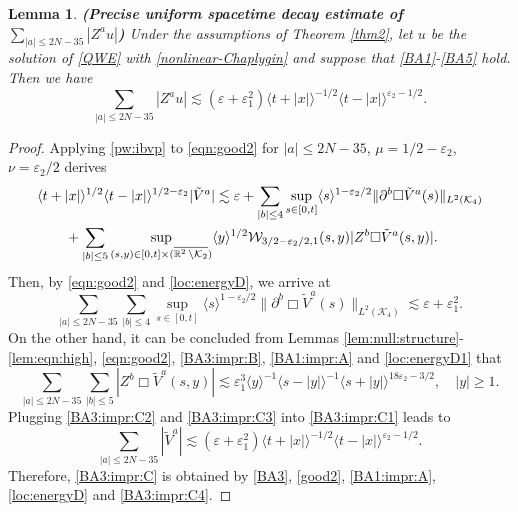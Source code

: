 \documentclass[11pt,twoside]{article}
\def\cK{\mathcal K}
\def\cW{\mathcal W}
\def\R{\mathop{\mathbb R\kern 0pt}\nolimits}
\def\ds{\displaystyle}
\def\p{\partial}
\def\ve{\varepsilon}
\def\ls{\lesssim}
\newcommand{\w}[1]{\langle {#1} \rangle}
\theoremstyle{plain}
\newtheorem{lemma}[theorem]{Lemma}
\theoremstyle{definition}
\numberwithin{equation}{section}
\begin{document}
\begin{lemma}
{\bf (Precise uniform spacetime decay estimate of $\ds\sum_{|a|\le2N-35}|Z^au|$)}
Under the assumptions of Theorem \ref{thm2}, let $u$ be the solution of \eqref{QWE} with \eqref{nonlinear-Chaplygin}
and suppose that \eqref{BA1}-\eqref{BA5} hold.
Then we have
\begin{equation}\label{BA3:impr:C}
\sum_{|a|\le2N-35}|Z^au|\ls(\ve+\ve_1^2)\w{t+|x|}^{-1/2}\w{t-|x|}^{\ve_2-1/2}.
\end{equation}
\end{lemma}
\begin{proof}
Applying \eqref{pw:ibvp} to \eqref{eqn:good2} for $|a|\le2N-35$, $\mu=1/2-\ve_2$, $\nu=\ve_2/2$ derives
\begin{equation}\label{BA3:impr:C1}
\begin{split}
&\w{t+|x|}^{1/2}\w{t-|x|}^{1/2-\ve_2}|\tilde V^a|\ls\ve+\sum_{|b|\le4}\sup_{s\in[0,t]}\w{s}^{1-\ve_2/2}\|\p^b\Box\tilde V^a(s)\|_{L^2(\cK_4)}\\
&\qquad+\sum_{|b|\le5}\sup_{(s,y)\in[0,t]\times(\overline{\R^2\setminus\cK_2})}\w{y}^{1/2}\cW_{3/2-\ve_2/2,1}(s,y)|Z^b\Box\tilde V^a(s,y)|.
\end{split}
\end{equation}
Then, by \eqref{eqn:good2} and \eqref{loc:energyD}, we arrive at
\begin{equation}\label{BA3:impr:C2}
\sum_{|a|\le2N-35}\sum_{|b|\le4}\sup_{s\in[0,t]}\w{s}^{1-\ve_2/2}\|\p^b\Box\tilde V^a(s)\|_{L^2(\cK_4)}\ls\ve+\ve_1^2.
\end{equation}
On the other hand, it can be concluded from Lemmas \ref{lem:null:structure}-\ref{lem:eqn:high}, \eqref{eqn:good2}, \eqref{BA3:impr:B}, \eqref{BA1:impr:A} and \eqref{loc:energyD1} that
\begin{equation}\label{BA3:impr:C3}
\sum_{|a|\le2N-35}\sum_{|b|\le5}|Z^b\Box\tilde V^a(s,y)|\ls\ve_1^3\w{y}^{-1}\w{s-|y|}^{-1}\w{s+|y|}^{18\ve_2-3/2},\quad |y|\ge1.
\end{equation}
Plugging \eqref{BA3:impr:C2} and \eqref{BA3:impr:C3} into \eqref{BA3:impr:C1} leads to
\begin{equation}\label{BA3:impr:C4}
\sum_{|a|\le2N-35}|\tilde V^a|\ls(\ve+\ve_1^2)\w{t+|x|}^{-1/2}\w{t-|x|}^{\ve_2-1/2}.
\end{equation}
Therefore, \eqref{BA3:impr:C} is obtained by \eqref{BA3}, \eqref{good2}, \eqref{BA1:impr:A},
\eqref{loc:energyD} and \eqref{BA3:impr:C4}.
\end{proof}
\end{document}
